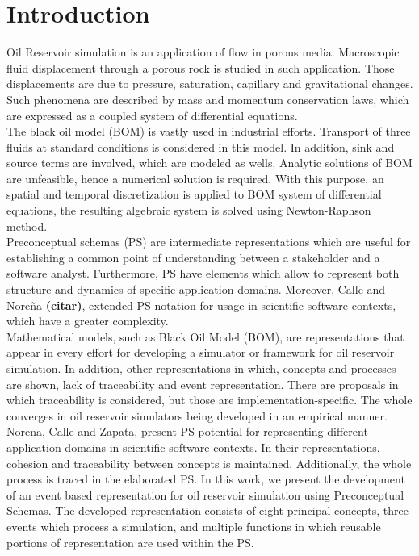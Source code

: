 \documentclass[review]{elsarticle}
\begin{document}
\linenumbers

\section{Introduction}
Oil Reservoir simulation is an application of flow in porous media. Macroscopic fluid displacement through a porous rock is studied in such application. Those displacements are due to pressure, saturation, capillary and gravitational changes. Such phenomena are described by mass and momentum conservation laws, which are expressed as a coupled system of differential equations.\\

The black oil model (BOM) is vastly used in industrial efforts. Transport of three fluids at standard conditions is considered in this model. In addition, sink and source terms are involved, which are modeled as wells. Analytic solutions of BOM are unfeasible, hence a numerical solution is required. With this purpose, an spatial and temporal discretization is applied to BOM system of differential equations, the resulting algebraic system is solved using Newton-Raphson method.\\

Preconceptual schemas (PS) are intermediate representations which are useful for establishing a common point of understanding between a stakeholder and a software analyst. Furthermore, PS have elements which allow to represent both structure and dynamics of specific application domains. Moreover, Calle and Nore\~na {\color{red} \textbf{(citar)}}, extended PS notation for usage in scientific software contexts, which have a greater complexity.\\

Mathematical models, such as Black Oil Model (BOM), are representations that appear in every effort for developing a simulator or framework for oil reservoir simulation. In addition, other representations in which, concepts and processes are shown, lack of traceability and event representation. There are proposals in which traceability is considered, but those are implementation-specific. The whole converges in oil reservoir simulators being developed in an empirical manner.\\

Norena, Calle and Zapata, present PS potential for representing different application domains in scientific software contexts. In their representations, cohesion and traceability between concepts is maintained. Additionally, the whole process is traced in the elaborated PS. In this work, we present the development of an event based representation for oil reservoir simulation using Preconceptual Schemas. The developed representation consists of eight principal concepts, three events which process a simulation, and multiple functions in which reusable portions of representation are used within the PS.\\
\end{document}
